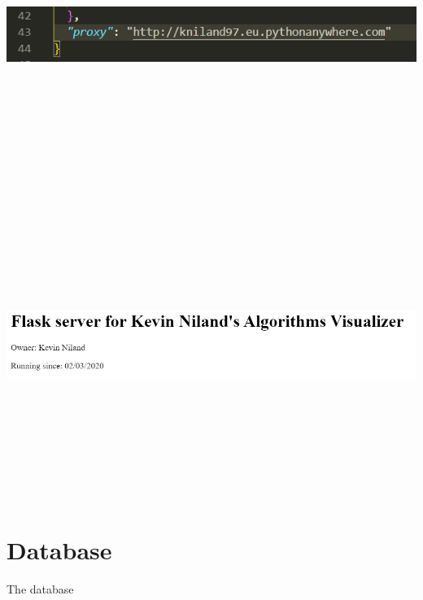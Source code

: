 \begin{center}
    \includegraphics[width=15cm,height=10cm,keepaspectratio]{images/proxy}
    \includegraphics[width=15cm,height=10cm,keepaspectratio]{images/pa_kn}
\end{center}

\section{Database}
The database 